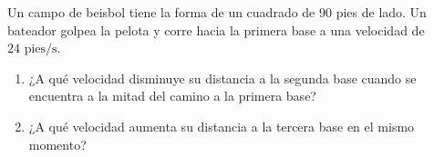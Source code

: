 \item Un campo de beisbol tiene la forma de un cuadrado de $90$ pies de lado. Un bateador golpea la pelota y corre hacia la primera base a una velocidad de $24 \text{ pies/s}$.
\begin{enumerate}
    \item[(a)] ¿A qué velocidad disminuye su distancia a la segunda base cuando se encuentra a la mitad del camino a la primera base?
    \item[(b)] ¿A qué velocidad aumenta su distancia a la tercera base en el mismo momento?
\end{enumerate}
\begin{center}
\end{center}

